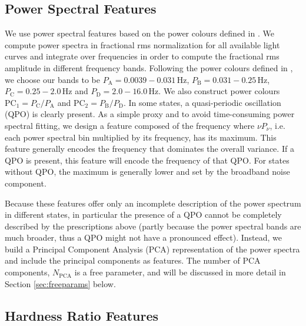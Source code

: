 \documentclass[fleqn,usenatbib]{mnras}
\begin{document}

\subsection{Power Spectral Features}

We use power spectral features based on the power colours defined in \citep{heil2015}. We compute power spectra in fractional rms normalization for all available light curves and integrate over frequencies in order to compute the fractional rms amplitude in different frequency bands. 
Following the power colours defined in \citet{heil2015}, we choose our bands to be $P_\mathrm{A} = 0.0039-0.031 \,\mathrm{Hz}$, 
$P_\mathrm{B} = 0.031-0.25 \,\mathrm{Hz}$, $P_\mathrm{C} =  0.25-2.0 \,\mathrm{Hz}$ and $P_\mathrm{D} = 2.0-16.0 \,\mathrm{Hz}$. We also construct power colours $\mathrm{PC}_1 = P_\mathrm{C}/P_\mathrm{A}$ and  $\mathrm{PC}_2 = P_\mathrm{B}/P_\mathrm{D}$.
In some states, a quasi-periodic oscillation (QPO) is clearly present. As a simple proxy and to avoid time-consuming power spectral fitting, we design a feature composed of the frequency where $\nu P_\nu$, i.e. each power spectral bin multiplied by its frequency,  has its maximum. This feature generally encodes the frequency that dominates the overall variance. If a QPO is present, this feature will encode the frequency of that QPO. For states without QPO, the maximum is generally lower and set by the broadband noise component.

Because these features offer only an incomplete description of the power spectrum in different states, in particular the presence of a QPO cannot be completely described by the prescriptions above (partly because the power spectral bands are much broader, thus a QPO might not have a pronounced effect). Instead, we build a Principal Component Analysis (PCA) representation of the power spectra and include the principal components as features. The number of PCA components, $N_\mathrm{PCA}$ is a free parameter, and will be discussed in more detail in Section \ref{sec:freeparams} below. 

\subsection{Hardness Ratio Features}
\end{document}
